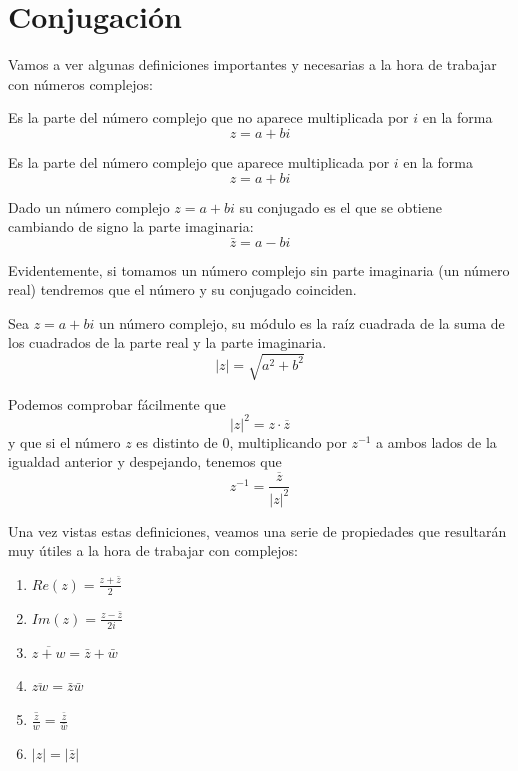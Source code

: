 \documentclass{apuntes}
\begin{document}
\section{Conjugación}
Vamos a ver algunas definiciones importantes y necesarias a la hora de trabajar con números complejos:

\begin{defn}
Es la parte del número complejo que no aparece multiplicada por $i$ en la forma
\[z = a + bi\]
\end{defn}

\begin{defn}
Es la parte del número complejo que aparece multiplicada por $i$ en la forma
\[z = a + bi\]
\end{defn}

\begin{defn}[Conjugado]
Dado un número complejo $z=a+bi$ su conjugado es el que se obtiene cambiando de signo la parte imaginaria:
\[\bar{z}=a-bi\]

Evidentemente, si tomamos un número complejo sin parte imaginaria (un número real) tendremos que el número y su conjugado coinciden.
\end{defn}

\begin{defn}[Módulo]
Sea $z=a+bi$ un número complejo, su módulo es la raíz cuadrada de la suma de los cuadrados de la parte real y la parte imaginaria.
\[|z|=\sqrt{a^2+b^2}\]

Podemos comprobar fácilmente que
\[|z|^2=z \cdot \overline{z}\]
y que si el número $z$ es distinto de 0, multiplicando por $z^{-1}$ a ambos lados de la igualdad anterior y despejando, tenemos que
\[z^{-1}=\frac{\overline{z}}{|z|^2}\]
\end{defn}

Una vez vistas estas definiciones, veamos una serie de propiedades que resultarán muy útiles a la hora de trabajar con complejos:
\begin{enumerate}
\item $Re(z)=\frac{z+\bar{z}}{2}$
\item $Im(z)=\frac{z-\bar{z}}{2i}$
\item $\overline{z+w}=\bar{z}+\bar{w}$
\item $\overline{zw}=\bar{z}\bar{w}$
\item $\overline{\frac{z}{w}}=\frac{\bar{z}}{\bar{w}}$
\item $|z|=|\bar{z}|$
\end{enumerate}
\end{document}
